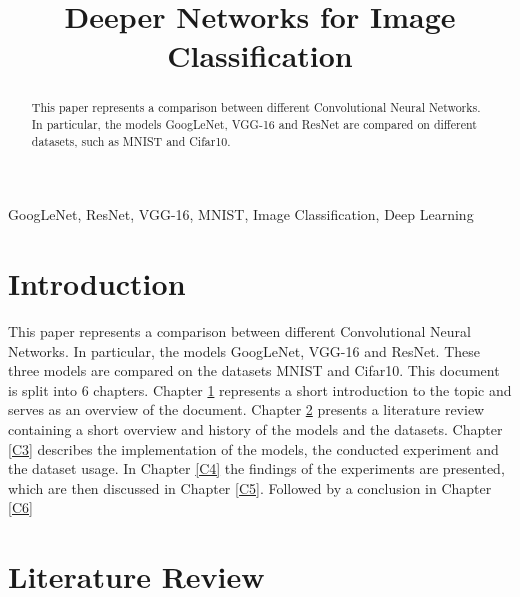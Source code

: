 \documentclass[conference]{IEEEtran}
\begin{document}
\title{Deeper Networks for Image Classification}

\author{
}

\maketitle

\begin{abstract}
This paper represents a comparison between different Convolutional Neural Networks. In particular, the models GoogLeNet, VGG-16 and ResNet are compared on different datasets, such as MNIST and Cifar10.
\end{abstract}

\begin{IEEEkeywords}
GoogLeNet, ResNet, VGG-16, MNIST, Image Classification, Deep Learning
\end{IEEEkeywords}

\section{Introduction}\label{C1}
This paper represents a comparison between different Convolutional Neural Networks. In particular, the models GoogLeNet, VGG-16 and ResNet. These three models are compared on the datasets MNIST and Cifar10.
This document is split into 6 chapters. Chapter \ref{C1} represents a short introduction to the topic and serves as an overview of the document.
Chapter \ref{C2} presents a literature review containing a short overview and history of the models and the datasets.
Chapter \ref{C3} describes the implementation of the models, the conducted experiment and the dataset usage.
In Chapter \ref{C4} the findings of the experiments are presented, which are then discussed in Chapter \ref{C5}.
Followed by a conclusion in Chapter \ref{C6}

\section{Literature Review}\label{C2}
\end{document}
